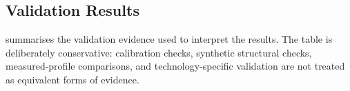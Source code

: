

\subsection{Validation Results}
\label{sec:resultValidation}

 summarises the validation evidence used
to interpret the results. The table is deliberately conservative: calibration
checks, synthetic structural checks, measured-profile comparisons, and
technology-specific validation are not treated as equivalent forms of evidence.

